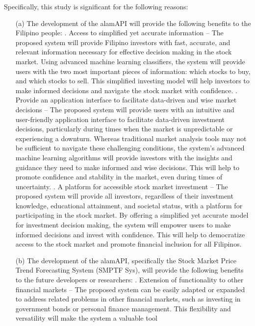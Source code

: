 Specifically, this study is significant for the following reasons:
\begin{itemize}
  \item[(a)] The development of the alamAPI will provide the 
  following benefits to the Filipino people:
  .	Access to simplified yet accurate information 
  – The proposed system will provide Filipino investors with fast, 
  accurate, and relevant information necessary for effective decision making 
  in the stock market. Using advanced machine learning classifiers, the system 
  will provide users with the two most important pieces of information: 
  which stocks to buy, and which stocks to sell. This simplified investing 
  model will help investors to make informed decisions and navigate the stock 
  market with confidence.
  .	Provide an application interface to facilitate data-driven 
  and wise market decisions – The proposed system will provide users with 
  an intuitive and user-friendly application interface to facilitate data-driven 
  investment decisions, particularly during times when the market is unpredictable 
  or experiencing a downturn. Whereas traditional market analysis tools may not 
  be sufficient to navigate these challenging conditions, the system's advanced 
  machine learning algorithms will provide investors with the insights and guidance 
  they need to make informed and wise decisions. This will help to promote 
  confidence and stability in the market, even during times of uncertainty.
  .	A platform for accessible stock market investment – 
  The proposed system will provide all investors, regardless of their 
  investment knowledge, educational attainment, and societal status, 
  with a platform for participating in the stock market. By offering a 
  simplified yet accurate model for investment decision making, the 
  system will empower users to make informed decisions and invest with confidence. 
  This will help to democratize access to the stock market and promote financial 
  inclusion for all Filipinos.
  \item[(b)] The development of the alamAPI, specifically the Stock Market Price 
  Trend Forecasting System (SMPTF Sys), will provide the following benefits 
  to the future developers or researchers:
  .	Extension of functionality to other financial markets 
  – The proposed system can be easily adapted or expanded to address 
  related problems in other financial markets, such as investing in
  government bonds or personal finance management. 
  This flexibility and versatility will make the system a valuable tool 

\end{itemize}

